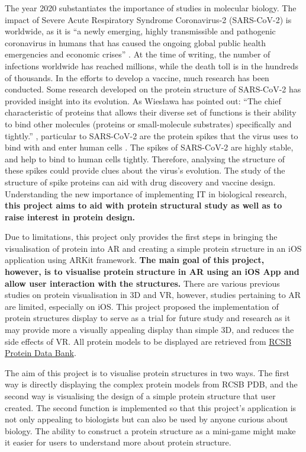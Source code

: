The year 2020 substantiates the importance of studies in molecular biology. The impact of Severe Acute Respiratory Syndrome Coronavirus-2 (SARS-CoV-2) is worldwide, as it is ``a newly emerging, highly transmissible and pathogenic coronavirus in humans that has caused the ongoing global public health emergencies and economic crises'' \parencite{mittal_covid-19_2020}. At the time of writing, the number of infections worldwide has reached millions, while the death toll is in the hundreds of thousands. In the efforts to develop a vaccine, much research has been conducted. Some research developed on the protein structure of SARS-CoV-2 has provided insight into its evolution. As Wiesława has pointed out: ``The chief characteristic of proteins that allows their diverse set of functions is their ability to bind other molecules (proteins or small-molecule substrates) specifically and tightly.'' \parencite{hutchison_protein_2013}, particular to SARS-CoV-2 are the protein spikes that the virus uses to bind with and enter human cells \parencite{wrobel_sars-cov-2_2020}. The spikes of SARS-CoV-2 are highly stable, and help to bind to human cells tightly. Therefore, analysing the structure of these spikes could provide clues about the virus’s evolution. The study of the structure of spike proteins can aid with drug discovery and vaccine design. 
Understanding the new importance of implementing IT in biological research, \textbf{this project aims to aid with protein structural study as well as to raise interest in protein design.}

Due to limitations, this project only provides the first steps in bringing the visualisation of protein into AR and creating a simple protein structure in an iOS application using ARKit framework. \textbf{The main goal of this project, however, is to visualise protein structure in AR using an iOS App and allow user interaction with the structures.} 
There are various previous studies on protein visualisation in 3D and VR, however, studies pertaining to AR are limited, especially on iOS. This project proposed the implementation of protein structures display to serve as a trial for future study and research as it may provide more a visually appealing display than simple 3D, and reduces the side effects of VR. All protein models to be displayed are retrieved from \href{https://www.rcsb.org/}{RCSB Protein Data Bank}. 

The aim of this project is to visualise protein structures in two ways. The first way is directly displaying the complex protein models from RCSB PDB, and the second way is visualising the design of a simple protein structure that user created. The second function is implemented so that this project's application is not only appealing to biologists but can also be used by anyone curious about biology. The ability to construct a protein structure as a mini-game might make it easier for users to understand more about protein structure. 

